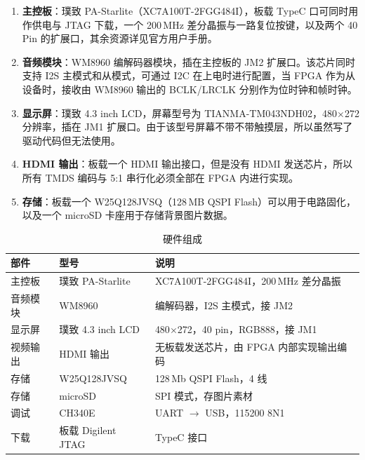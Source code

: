 \documentclass[withoutpreface,bwprint]{cumcmthesis}
\begin{document}
\begin{enumerate}
\item \textbf{主控板}：璞致 PA-Starlite（XC7A100T-2FGG484I），板载 TypeC 口可同时用作供电与 JTAG 下载，一个 200\,MHz 差分晶振与一路复位按键，以及两个 40 Pin 的扩展口，其余资源详见官方用户手册。 
\item \textbf{音频模块}：WM8960 编解码器模块，插在主控板的 JM2 扩展口。该芯片同时支持 I2S 主模式和从模式，可通过 I2C 在上电时进行配置，当 FPGA 作为从设备时，接收由 WM8960 输出的 BCLK/LRCLK 分别作为位时钟和帧时钟。
\item \textbf{显示屏}：璞致 4.3 inch LCD，屏幕型号为 TIANMA-TM043NDH02，480$\times$272 分辨率，插在 JM1 扩展口。由于该型号屏幕不带不带触摸层，所以虽然写了驱动代码但无法使用。
\item \textbf{HDMI 输出}：板载一个 HDMI 输出接口，但是没有 HDMI 发送芯片，所以所有 TMDS 编码与 5:1 串行化必须全部在 FPGA 内进行实现。
\item \textbf{存储}：板载一个 W25Q128JVSQ（128\,MB QSPI Flash）可以用于电路固化，以及一个 microSD 卡座用于存储背景图片数据。
\end{enumerate}

\begin{table}[H]
\centering
\caption{硬件组成}
\label{tab:hw}
\begin{tabular}{p{2.6cm}p{4.4cm}p{6.4cm}}
\toprule[1.5pt]
\rowcolor{gray!25} 部件 & 型号 & 说明 \\
\midrule[1pt]
主控板 & 璞致 PA-Starlite & XC7A100T-2FGG484I，200\,MHz 差分晶振 \\
音频模块 & WM8960 & 编解码器，I2S 主模式，接 JM2 \\
显示屏 & 璞致 4.3 inch LCD & 480$\times$272，40 pin，RGB888，接 JM1 \\
视频输出 & HDMI 输出 & 无板载发送芯片，由 FPGA 内部实现输出编码 \\
存储 & W25Q128JVSQ & 128\,Mb QSPI Flash，4 线 \\
存储 & microSD & SPI 模式，存图片素材 \\
调试 & CH340E & UART $\rightarrow$ USB，115200 8N1 \\
下载 & 板载 Digilent JTAG & TypeC 接口 \\
\bottomrule[1.5pt]
\end{tabular}
\end{table}

\end{document}
